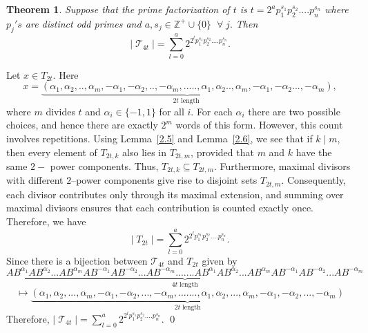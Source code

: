 \documentclass[a4paper,12pt]{amsart}
\renewenvironment{proof}{{\bfseries Proof.}}{\qed}
\numberwithin{equation}{section}
\newtheorem{theorem}{Theorem}[section]
\theoremstyle{definition}
\newcommand{\lemref}[1]{Lemma~\ref{#1}}
\numberwithin{equation}{section}
\begin{document}
\begin{theorem}\label{2.7}
Suppose that the prime factorization of $t$ is $ t=2^ap_1^{s_1}p_2^{s_2}....p_n^{s_n} $ where $p_j's$ are distinct odd primes and $a, s_j \in \mathbb{Z}^+ \cup \{0\} \;\;\forall \; j.$ Then $$\lvert\;\mathcal{T}_{4t}\;\rvert=\sum_{l=0}^{a}2^{2^lp_1^{s_1}p_2^{s_2}....p_n^{s_n}}.$$
\end{theorem}
\begin{proof}
  Let $x \in T_{2t}$. Here $$ x = \underbrace{\scriptstyle (\alpha_1,\alpha_2,..,\alpha_m,-\alpha_1, -\alpha_2,.., -\alpha_m,.....,\alpha_1, \alpha_2..,\alpha_m,-\alpha_1, -\alpha_2..., -\alpha_m)}_{2t \text{ length }},$$ where $m$ divides $t$ and $\alpha_i \in \{-1,1\}$ for all $i$. For each $\alpha_i$ there are two possible choices, and hence there are exactly $2^{m}$ words of this form. However, this count involves repetitions. Using \lemref{2.5} and \lemref{2.6}, we see that if $k \mid m$, then every element of $T_{2t,k}$ also lies in $T_{2t,m}$, provided that $m$ and $k$ have the same $2-$ power components. Thus, $T_{2t,k} \subseteq T_{2t,m}.$ Furthermore, maximal divisors with different $2$--power components give rise to disjoint sets $T_{2t,m}$. Consequently, each divisor contributes only through its maximal extension, and summing over maximal divisors ensures that each contribution is counted exactly once. Therefore, we have $$\lvert\;T_{2t}\;\rvert=\sum_{l=0}^{a}2^{2^lp_1^{s_1}p_2^{s_2}....p_n^{s_n}}.$$
  Since there is a bijection between $\mathcal{T}_{4t}$ and $T_{2t}$ given by $$ \underbrace{\scriptstyle AB^{\alpha_1}AB^{\alpha_2}...AB^{\alpha_m}AB^{-\alpha_1}AB^{-\alpha_2}...AB^{-\alpha_m}.......AB^{\alpha_1}AB^{\alpha_2}...AB^{\alpha_m}AB^{-\alpha_1}AB^{-\alpha_2}...AB^{-\alpha_m}}_{4t \;\text{length}} $$$$\mapsto  \underbrace{\scriptstyle (\alpha_1, \alpha_2,...,\alpha_m,-\alpha_1,-\alpha_2,...,-\alpha_m,.......,\alpha_1,\alpha_2,...,\alpha_m,-\alpha_1,-\alpha_2,...,-\alpha_m)}_{2t \;\text{length}}$$ 
  Therefore, $\lvert\;\mathcal{T}_{4t}\;\rvert=\sum_{l=0}^{a}2^{2^lp_1^{s_1}p_2^{s_2}....p_n^{s_n}}$.
\end{proof}
\end{document}
